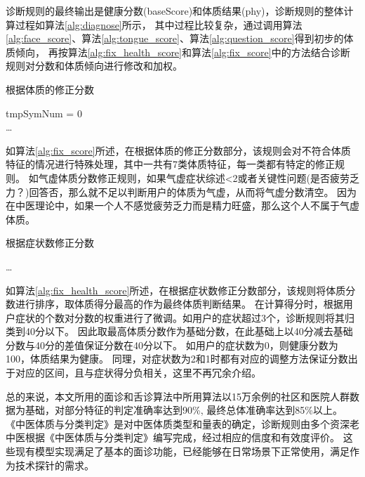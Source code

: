 诊断规则的最终输出是健康分数(baseScore)和体质结果(phy)，诊断规则的整体计算过程如算法\ref{alg:diagnose}所示，
其中过程比较复杂，通过调用算法\ref{alg:face_score}、算法\ref{alg:tongue_score}、算法\ref{alg:question_score}得到初步的体质倾向，
再按算法\ref{alg:fix_health_score}和算法\ref{alg:fix_score}中的方法结合诊断规则对分数和体质倾向进行修改和加权。

\begin{algorithm}[htbp]
\caption{根据体质的修正分数\cite{张红凯2018基于舌}}%
\label{alg:fix_score}
\LinesNumbered %
tmpSymNum = 0\\
\ldots\\
\end{algorithm}
如算法\ref{alg:fix_score}所述，在根据体质的修正分数部分，该规则会对不符合体质特征的情况进行特殊处理，其中一共有7类体质特征，每一类都有特定的修正规则。
如气虚体质分数修正规则，如果气虚症状综述<2或者关键性问题(是否疲劳乏力？)回答否，那么就不足以判断用户的体质为气虚，从而将气虚分数清空。
因为在中医理论中，如果一个人不感觉疲劳乏力而是精力旺盛，那么这个人不属于气虚体质。

\begin{algorithm}[htbp]
\caption{根据症状数修正分数\cite{张红凯2018基于舌}}%
\label{alg:fix_health_score}
\LinesNumbered %
\ldots\\
\end{algorithm}
如算法\ref{alg:fix_health_score}所述，在根据症状数修正分数部分，该规则将体质分数进行排序，取体质得分最高的作为最终体质判断结果。
在计算得分时，根据用户症状的个数对分数的权重进行了微调。如用户的症状超过3个，诊断规则将其归类到40分以下。
因此取最高体质分数作为基础分数，在此基础上以40分减去基础分数与40分的差值保证分数在40分以下。
如用户的症状数为0，则健康分数为100，体质结果为健康。
同理，对症状数为2和1时都有对应的调整方法保证分数出于对应的区间，且与症状得分负相关，这里不再冗余介绍。

总的来说，本文所用的面诊和舌诊算法中所用算法以15万余例的社区和医院人群数据为基础，对部分特征的判定准确率达到90\%, 最终总体准确率达到85\%以上\cite{Zhang2018Study, Zhao2014Qualitative, 李雪2016}。
《中医体质与分类判定》是对中医体质类型和量表的确定，诊断规则由多个资深老中医根据《中医体质与分类判定》编写完成，经过相应的信度和有效度评价\cite{朱燕波2006中医体质量表性能的初步评价,Zhang2018Study}。
这些现有模型实现满足了基本的面诊功能，已经能够在日常场景下正常使用，满足作为技术探针的需求。
